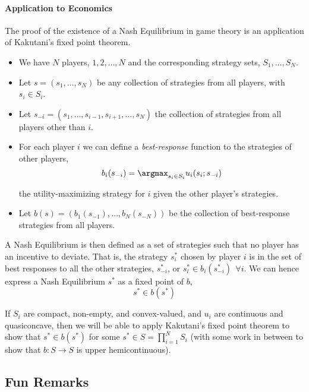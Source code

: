 \documentclass{article}
\begin{document}
\paragraph{Application to Economics}
\label{par:application_to_economics}

The proof of the existence of a Nash Equilibrium in game theory is an application of Kakutani's fixed point theorem.
\begin{itemize}[label=$\bullet$]
  \item We have $N$ players, $1, 2, \ldots, N$ and the corresponding strategy sets, $S_1, \ldots, S_N$.
  \item Let $s = (s_1, \ldots, s_N)$ be any collection of strategies from all players, with $s_i \in S_i$.
  \item Let $s_{-i} = (s_1, \ldots, s_{i - 1}, s_{i + 1}, \ldots, s_N)$ the collection of strategies from all players other than $i$.
  \item For each player $i$ we can define a \textit{best-response} function to the strategies of other players,
    \[
      b_i(s_{-i}) = \argmax_{s_i \in S_i} u_i(s_i; s_{-i})
    \]

    the utility-maximizing strategy for $i$ given the other player's strategies.

  \item Let $b(s) = \left(b_1(s_{-1}), \ldots, b_N(s_{-N})\right)$ be the collection of best-response strategies from all players.
\end{itemize}

A Nash Equilibrium is then defined as a set of strategies such that no player has an incentive to deviate. That is, the strategy $s^*_i$ chosen by player $i$ is in the set of best responses to all the other strategies, $s^*_{-i}$, or $s^*_i \in b_i(s^*_{-i}) ~~ \forall i$. We can hence express a Nash Equilibrium $s^*$ as a fixed point of $b$,
\[
  s^* \in b(s^*)
\]

If $S_i$ are compact, non-empty, and convex-valued, and $u_i$ are continuous and quasiconcave, then we will be able to apply Kakutani's fixed point theorem to show that $s^* \in b(s^*)$ for some $s^* \in S = \prod_{i = 1}^N S_i$ (with some work in between to show that $b: S \to S$ is upper hemicontinuous).

\subsection{Fun Remarks}
\label{sub:fun_remarks}
\end{document}
